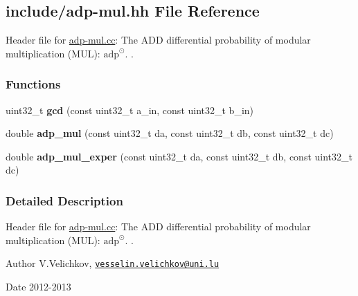 \hypertarget{adp-mul_8hh}{\subsection{include/adp-\/mul.hh \-File \-Reference}
\label{adp-mul_8hh}
}


\-Header file for \hyperlink{adp-mul_8cc}{adp-\/mul.\-cc}\-: \-The \-A\-D\-D differential probability of modular multiplication (\-M\-U\-L)\-: $\mathrm{adp}^{\odot}$. .  


\subsubsection*{\-Functions}
\begin{DoxyCompactItemize}
\item 
\hypertarget{adp-mul_8hh_a9464d8ae9ca8a4435af328b83e4805f8}{uint32\-\_\-t {\bfseries gcd} (const uint32\-\_\-t a\-\_\-in, const uint32\-\_\-t b\-\_\-in)}\label{adp-mul_8hh_a9464d8ae9ca8a4435af328b83e4805f8}

\item 
\hypertarget{adp-mul_8hh_aca5420444a232210f3116127f9bc06e2}{double {\bfseries adp\-\_\-mul} (const uint32\-\_\-t da, const uint32\-\_\-t db, const uint32\-\_\-t dc)}\label{adp-mul_8hh_aca5420444a232210f3116127f9bc06e2}

\item 
\hypertarget{adp-mul_8hh_a1b96a9c60eb19647e8b7a2ef5b109a31}{double {\bfseries adp\-\_\-mul\-\_\-exper} (const uint32\-\_\-t da, const uint32\-\_\-t db, const uint32\-\_\-t dc)}\label{adp-mul_8hh_a1b96a9c60eb19647e8b7a2ef5b109a31}

\end{DoxyCompactItemize}


\subsubsection{\-Detailed \-Description}
\-Header file for \hyperlink{adp-mul_8cc}{adp-\/mul.\-cc}\-: \-The \-A\-D\-D differential probability of modular multiplication (\-M\-U\-L)\-: $\mathrm{adp}^{\odot}$. . \begin{DoxyAuthor}{\-Author}
\-V.\-Velichkov, \href{mailto:vesselin.velichkov@uni.lu}{\tt vesselin.\-velichkov@uni.\-lu} 
\end{DoxyAuthor}
\begin{DoxyDate}{\-Date}
2012-\/2013 
\end{DoxyDate}
